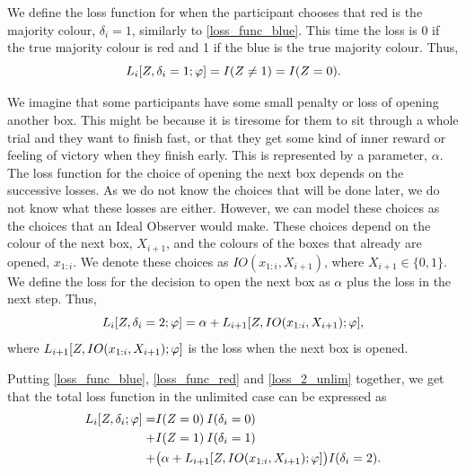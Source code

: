 We define the loss function for when the participant chooses that red is the majority colour, $\delta_i=1$, similarly to \eqref{loss_func_blue}. This time the loss is 0 if the true majority colour is red and 1 if the blue is the true majority colour. Thus,
\begin{equation}
\label{loss_func_red}
    L_i[Z,\delta_i=1;\varphi] = I(Z\neq1)=I(Z=0).
\end{equation}

We imagine that some participants have some small penalty or loss of opening another box. This might be because it is tiresome for them to sit through a whole trial and they want to finish fast, or that they get some kind of inner reward or feeling of victory when they finish early. This is represented by a parameter, $\alpha$. 
The loss function for the choice of opening the next box depends on the successive losses. As we do not know the choices that will be done later, we do not know what these losses are either. However, we can model these choices as the choices that an Ideal Observer would make. These choices depend on the colour of the next box, $X_{i+1}$, and the colours of the boxes that already are opened, $x_{1:i}$. We denote these choices as $IO(x_{1:i},X_{i+1})$, where $X_{i+1} \in \{0,1\}$.
We define the loss for the decision to open the next box as $\alpha$ plus the loss in the next step. Thus, 
\begin{equation}
\label{loss_2_unlim}
    L_i[Z,\delta_i=2;\varphi] = \alpha + L_{i+1}[Z,IO(x_{1:i},X_{i+1});\varphi],
\end{equation}
where $L_{i+1}[Z,IO(x_{1:i},X_{i+1});\varphi]$ is the loss when the next box is opened. 


Putting \eqref{loss_func_blue}, \eqref{loss_func_red} and \eqref{loss_2_unlim} together, we get that the total loss function in the unlimited case can be expressed as
\begin{equation}
\label{tot_loss_unlim}
    \begin{aligned}
       L_i[Z,\delta_{i};\varphi] 
       =& I(Z=0)\: I(\delta_i=0) \\
       +& I(Z=1)\: I(\delta_i=1)\\
       +& \big(\alpha + L_{i+1}[Z,IO(x_{1:i},X_{i+1});\varphi] \big) I(\delta_i=2).
    \end{aligned}
\end{equation}

